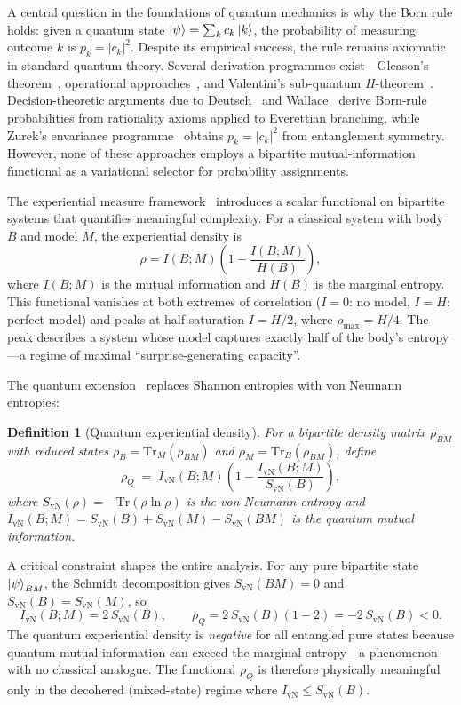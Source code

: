 \documentclass[12pt,a4paper]{article}
\newtheorem{definition}{Definition}
\newcommand{\SvN}{S_{\mathrm{vN}}}
\newcommand{\IvN}{I_{\mathrm{vN}}}
\newcommand{\rhoQ}{\rho_Q}
\renewcommand{\Tr}{\mathrm{Tr}}
\begin{document}
A central question in the foundations of quantum mechanics is why the
Born rule holds: given a quantum state $\ket{\psi} = \sum_k c_k
\ket{k}$, the probability of measuring outcome $k$ is $p_k =
|c_k|^2$.  Despite its empirical success, the rule remains
axiomatic in standard quantum theory.  Several derivation programmes
exist---Gleason's theorem~\cite{Gleason1957}, operational
approaches~\cite{Chiribella2011}, and Valentini's
sub-quantum $H$-theorem~\cite{Valentini2005}.  Decision-theoretic
arguments due to Deutsch~\cite{Deutsch1999} and
Wallace~\cite{Wallace2007} derive Born-rule probabilities from
rationality axioms applied to Everettian branching, while Zurek's
envariance programme~\cite{Zurek2005} obtains $p_k = |c_k|^2$ from
entanglement symmetry.  However, none of these approaches employs a
bipartite mutual-information functional as a variational selector
for probability assignments.

The experiential measure framework~\cite{Ehrlich2026a} introduces
a scalar functional on bipartite systems that quantifies meaningful
complexity.  For a classical system with body $B$ and model $M$, the
experiential density is
\begin{equation}\label{eq:rho-classical}
  \rho = I(B;M)\!\left(1 - \frac{I(B;M)}{H(B)}\right),
\end{equation}
where $I(B;M)$ is the mutual information and $H(B)$ is the marginal
entropy.  This functional vanishes at both extremes of correlation
($I = 0$: no model, $I = H$: perfect model) and peaks at half
saturation $I = H/2$, where $\rho_{\max} = H/4$.  The peak
describes a system whose model captures exactly half of the body's
entropy---a regime of maximal ``surprise-generating capacity''.

The quantum extension~\cite{Ehrlich2026a} replaces Shannon
entropies with von Neumann entropies:
\begin{definition}[Quantum experiential density]\label{def:rhoQ}
  For a bipartite density matrix $\rho_{BM}$ with reduced states
  $\rho_B = \Tr_M(\rho_{BM})$ and $\rho_M = \Tr_B(\rho_{BM})$,
  define
  \begin{equation}\label{eq:rhoQ}
    \rhoQ \;=\; \IvN(B;M)\!\left(
      1 - \frac{\IvN(B;M)}{\SvN(B)}
    \right),
  \end{equation}
  where $\SvN(\rho) = -\Tr(\rho \ln \rho)$ is the von Neumann
  entropy and $\IvN(B;M) = \SvN(B) + \SvN(M) - \SvN(BM)$ is the
  quantum mutual information.
\end{definition}

A critical constraint shapes the entire analysis.  For any pure
bipartite state $\ket{\psi}_{BM}$, the Schmidt decomposition gives
$\SvN(BM) = 0$ and $\SvN(B) = \SvN(M)$, so
\begin{equation}\label{eq:pure-ratio}
  \IvN(B;M) = 2\,\SvN(B),
  \qquad
  \rhoQ = 2\,\SvN(B)(1 - 2) = -2\,\SvN(B) < 0.
\end{equation}
The quantum experiential density is \emph{negative} for all entangled
pure states because quantum mutual information can exceed the
marginal entropy---a phenomenon with no classical analogue.  The
functional $\rhoQ$ is therefore physically meaningful only in the
decohered (mixed-state) regime where $\IvN \le \SvN(B)$.
\end{document}
